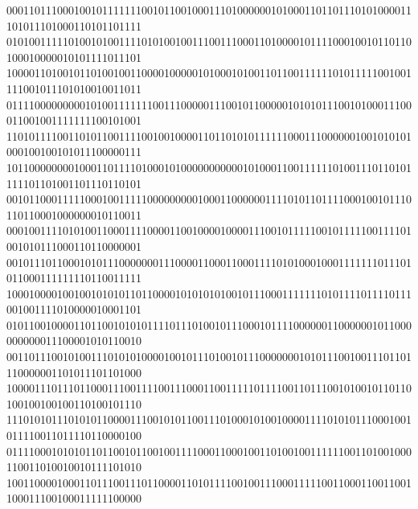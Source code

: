 \documentclass[10pt,\tflang,dvips]{book}
\begin{document}
{{\begin{minipage}{\oldpwidth}
{{{{000110111000100101111111001011001000111010000001010001101101110101000011101011101000110101101111\blue\\
010100111110100101001111010100100111001110001101000010111100010010110110100010000010101111011101\\
100001101001011010010011000010000010100010100110110011111101011111001001111001011101010010011011\blue\\
011110000000001010011111110011100000111001011000001010101110010100011100011001001111111100101001\\
110101111001101011001111001001000011011010101111110001110000001001010101000100100101011100000111\blue\\
101100000000100011011110100010100000000000101000110011111101001110110101111101101001101110110101\\
001011000111110001001111100000000010001100000011110101101111000100101110110110001000000010110011\blue\\
000100111101010011000111100001100100001000011100101111100101111100111101001010111000110110000001\\
001011101100010101110000000111000011000110001111010100010001111111011101011000111111110110011111\blue\\
100010000100100101010110110000101010101001011100011111110101111011110111001001111010000010001101\\
010110010000110110010101011110111010010111000101111000000110000001011000000000011100001010110010\blue\\
001101110010100111010101000010010111010010111000000010101110010011101101110000001101011101101000\blue\\
100001110111011000111001111001110001100111110111100110111001010010110110100100100100110100101110\blue\\
111010101110101011000011100101011001110100010100100001111010101110001001011110011011110110000100\blue\\
011110001010101101100101100100111100011000100110100100111111001101001000110011010010010111101010\blue\\
100110000100011011100111011000011010111100100111000111110011000110011001100011100100011111100000\blue\\
}}}}
\end{minipage}}}
\end{document}
